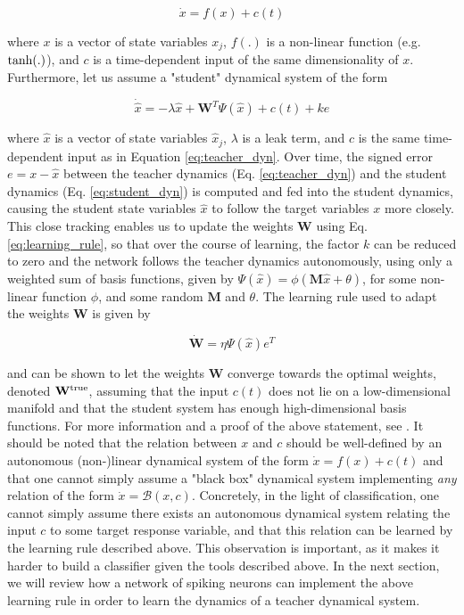 \documentclass[twoside,11pt,titlepage]{article}
\begin{document}
\begin{equation} \label{eq:teacher_dyn}
  \dot{x} = f(x) + c(t)
\end{equation}

where $x$ is a vector of state variables $x_j$, $f(.)$ is a non-linear function (e.g. $\textnormal{tanh}(.)$), and $c$ is a time-dependent input of the same dimensionality of $x$.
Furthermore, let us assume a "student" dynamical system of the form

\begin{equation} \label{eq:student_dyn}
  \dot{\hat{x}} = -\lambda \hat{x} + \mathbf{W}^T \Psi(\hat{x}) + c(t) + ke
\end{equation}

where $\hat{x}$ is a vector of state variables $\hat{x}_j$, $\lambda$ is a leak term, and $c$ is the same time-dependent input as in Equation \ref{eq:teacher_dyn}.
Over time, the signed error $e = x - \hat{x}$ between the teacher dynamics (Eq. \ref{eq:teacher_dyn}) and the student dynamics (Eq. \ref{eq:student_dyn}) is computed
and fed into the student dynamics, causing the student state variables $\hat{x}$ to follow the target variables $x$ more closely. This close tracking enables
us to update the weights $\mathbf{W}$ using Eq. \ref{eq:learning_rule}, so that over the course of learning, the factor $k$ can be reduced to zero and the network follows the teacher dynamics
autonomously, using only a weighted sum of basis functions, given by $\Psi(\hat{x})=\phi(\mathbf{M}\hat{x}+\theta)$, for some non-linear function $\phi$, and some random $\mathbf{M}$ and $\theta$.
The learning rule used to adapt the weights $\mathbf{W}$ is given by

\begin{equation} \label{eq:learning_rule}
  \dot{\mathbf{W}} = \eta \Psi(\hat{x})e^T
\end{equation}

and can be shown to let the weights $\mathbf{W}$ converge towards the optimal weights, denoted $\mathbf{W}^\textnormal{true}$, assuming that the input $c(t)$ does not lie on a
low-dimensional manifold and that the student system has enough high-dimensional basis functions. For more information and a proof of the above statement, see \cite{alemi2017learning}.
It should be noted that the relation between $x$ and $c$ should be well-defined by an autonomous (non-)linear dynamical system of the form $\dot{x} = f(x)+c(t)$ and that one cannot
simply assume a "black box" dynamical system implementing \textit{any} relation of the form $\dot{x} = \mathcal{B}(x,c)$. Concretely, in the light of classification, one cannot simply
assume there exists an autonomous dynamical system relating the input $c$ to some target response variable, and that this relation can be learned by the learning rule described above.
This observation is important, as it makes it harder to build a classifier given the tools described above. In the next section, we will review how a network of spiking neurons can
implement the above learning rule in order to learn the dynamics of a teacher dynamical system.
\end{document}

